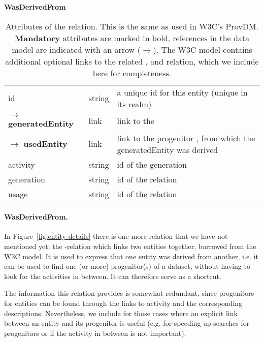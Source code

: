 \begin{table}[h]

\small
{}\textwidth

\textbf{\normalsize WasDerivedFrom}\vspace{0.25em}\\
\begin{tabulary}{1.0\textwidth}{@{}lp{3cm}L@{}}
\toprule
{} &    & \\
\midrule
id               & string            & a unique id for this entity (unique in its realm)\\
$\rightarrow$ \textbf{generatedEntity} & link      & link to the \\
$\rightarrow$ \textbf{usedEntity}      & link      & link to the progenitor , from which the generatedEntity was derived\\
activity         & string            & id of the generation \\
generation       & string            & id of the  relation\\
usage            & string            & id of the  relation\\
\bottomrule
\end{tabulary}
\caption[Attributes of the  relation]{Attributes of the  relation. This is the same as used in W3C's ProvDM. \textbf{Mandatory} attributes are marked in bold, references in the data model are indicated with an arrow ($\rightarrow$). The W3C model contains additional optional links to the related ,  and  relation, which we include here for completeness.
}\label{tab:wasderivedfrom-attributes}
\end{table}


\paragraph{WasDerivedFrom.}
In Figure~\ref{fig:entity-details} there is one more relation that we have not mentioned yet: 
the -relation which links two entities together, borrowed from the W3C model. 
It is used to express that 
one entity was derived from another, i.e. it can be used to find one (or more) progenitor(s) 
of a dataset, without having to look for the activities in between. It can therefore serve as 
a shortcut.

The information this relation provides is somewhat redundant, since progenitors for entities
can be found through the links to activity and the corresponding descriptions.
Nevertheless, we include  for those cases where an explicit 
link between an entity and its progenitor is useful (e.g. for speeding up searches for 
progenitors or if the activity in between is not important).

